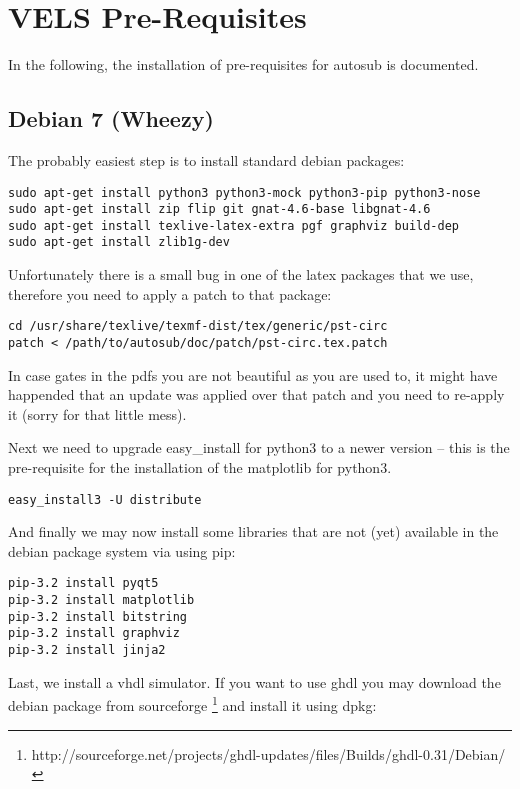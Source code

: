 \section{VELS Pre-Requisites} \label{system_prerequisites}

In the following, the installation of pre-requisites for autosub is documented.

\subsection{Debian 7 (Wheezy)}

The probably easiest step is to install standard debian packages:

\begin{verbatim}
sudo apt-get install python3 python3-mock python3-pip python3-nose 
sudo apt-get install zip flip git gnat-4.6-base libgnat-4.6 
sudo apt-get install texlive-latex-extra pgf graphviz build-dep
sudo apt-get install zlib1g-dev
\end{verbatim}

Unfortunately there is a small bug in one of the latex packages that we use,
therefore you need to apply a patch to that package:

\begin{verbatim}
cd /usr/share/texlive/texmf-dist/tex/generic/pst-circ
patch < /path/to/autosub/doc/patch/pst-circ.tex.patch
\end{verbatim}

In case gates in the pdfs you are not beautiful as you are used to, it might have
happended that an update was applied over that patch and you need to re-apply it (sorry for that little mess).


Next we need to upgrade easy\_install for python3 to a newer version -- this
is the pre-requisite for the installation of the matplotlib for python3.

\begin{verbatim}
easy_install3 -U distribute
\end{verbatim}

And finally we may now install some libraries that are not (yet) available in
the debian package system via using pip:

\begin{verbatim}
pip-3.2 install pyqt5
pip-3.2 install matplotlib
pip-3.2 install bitstring
pip-3.2 install graphviz
pip-3.2 install jinja2
\end{verbatim}

Last, we install a vhdl simulator. If you want to use ghdl you may download
the debian package from sourceforge \footnote{http://sourceforge.net/projects/ghdl-updates/files/Builds/ghdl-0.31/Debian/} and install it using dpkg:

